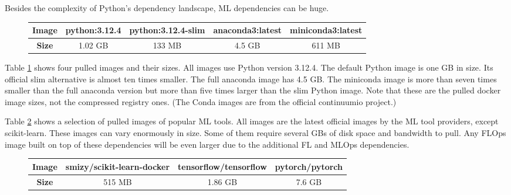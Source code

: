 Besides the complexity of Python's dependency landscape, ML dependencies can be huge.
\begin{figure}[t]
    \begin{changemargin}{0cm}{0cm}
        \centering
        \begin{tabular}{|c||c|c|c|c|}
            \hline
                \textbf{Image} & python:3.12.4 & python:3.12.4-slim & anaconda3:latest & miniconda3:latest \\
            \hline
                \textbf{Size} & 1.02 GB & 133 MB & 4.5 GB & 611 MB
            \\
            \hline
        \end{tabular}
        \label{table:conda_python_comparison}
    \end{changemargin}
\end{figure}
Table \ref{table:conda_python_comparison} shows four pulled images and their sizes.
All images use Python version 3.12.4.
The default Python image is one GB in size.
Its official slim alternative is almost ten times smaller.
The full anaconda image has 4.5 GB.
The miniconda image is more than seven times smaller than the full anaconda version but more than five times larger than the slim Python image.
Note that these are the pulled docker image sizes, not the compressed registry ones.
(The Conda images are from the official continuumio project.)

Table \ref{table:ml_libs_images_compared} shows a selection of pulled images of popular ML tools.
All images are the latest official images by the ML tool providers, except scikit-learn.
These images can vary enormously in size.
Some of them require several GBs of disk space and bandwidth to pull.
Any FLOps image built on top of these dependencies will be even larger due to the additional FL and MLOps dependencies.

\begin{figure}[t]
    \begin{changemargin}{0cm}{0cm}
        \centering
        \begin{tabular}{|c||c|c|c|}
            \hline
                \textbf{Image} & smizy/scikit-learn-docker & tensorflow/tensorflow & pytorch/pytorch \\
            \hline
                \textbf{Size} & 515 MB & 1.86 GB & 7.6 GB
            \\
            \hline
        \end{tabular}
        \label{table:ml_libs_images_compared}
    \end{changemargin}
    \end{figure}